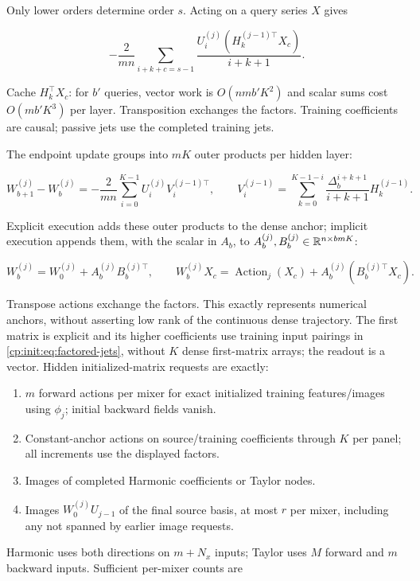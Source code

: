 Only lower orders determine order $s$. Acting on a query series $X$ gives

\begin{equation}
\label{cp:init:eq:cached-action}
-\frac2{mn}\sum_{i+k+c=s-1}
             \frac{U_i^{(j)}(H_k^{(j-1)\top}X_c)}{i+k+1}.
\end{equation}

Cache $H_k^\top X_c$: for $b'$ queries, vector work is
$O(nmb'K^2)$ and scalar sums cost $O(mb'K^3)$ per layer.
Transposition exchanges the factors. Training coefficients are causal;
passive jets use the completed training jets.

The endpoint update groups into $mK$ outer products per hidden layer:

\begin{equation}
\label{cp:init:eq:anchor-increment}
W_{b+1}^{(j)}-W_b^{(j)}
=-\frac2{mn}\sum_{i=0}^{K-1}U_i^{(j)}V_i^{(j-1)\top},\qquad
V_i^{(j-1)}=\sum_{k=0}^{K-1-i}
             \frac{\Delta_b^{i+k+1}}{i+k+1}H_k^{(j-1)}.
\end{equation}

Explicit execution adds these outer products to the dense anchor;
implicit execution appends them, with the scalar in $A_b$, to
$A_b^{(j)},B_b^{(j)}\in\mathbb R^{n\times bmK}$:

\begin{equation}
\label{cp:init:eq:implicit-anchor}
W_b^{(j)}=W_0^{(j)}+A_b^{(j)}B_b^{(j)\top},\qquad
W_b^{(j)}X_c=\operatorname{Action}_j(X_c)
                  +A_b^{(j)}(B_b^{(j)\top}X_c).
\end{equation}

Transpose actions exchange the factors. This exactly represents numerical
anchors, without asserting low rank of the continuous dense trajectory.
The first matrix is explicit and its higher coefficients use training
input pairings in \eqref{cp:init:eq:factored-jets}, without $K$ dense
first-matrix arrays; the readout is a vector. Hidden initialized-matrix
requests are exactly:

\begin{enumerate}
\item $m$ forward actions per mixer for exact initialized training
features/images using $\phi_j$; initial backward fields vanish.
\item Constant-anchor actions on source/training coefficients through $K$
per panel; all increments use the displayed factors.
\item Images of completed Harmonic coefficients or Taylor nodes.
\item Images $W_0^{(j)}U_{j-1}$ of the final source basis, at most
$r$ per mixer, including any not spanned by earlier image requests.
\end{enumerate}
Harmonic uses both directions on $m+N_x$ inputs; Taylor uses $M$
forward and $m$ backward inputs. Sufficient per-mixer counts are


